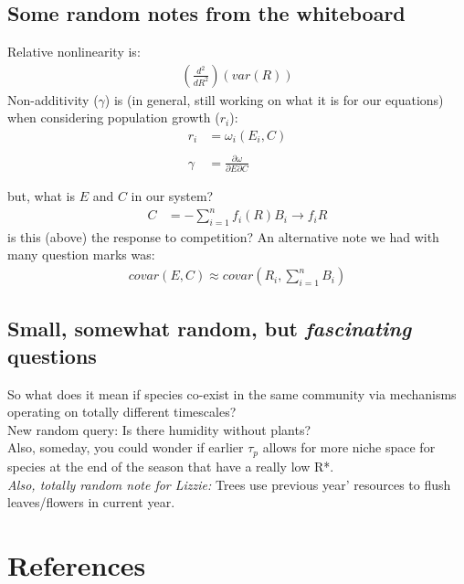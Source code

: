 \documentclass[11pt,a4paper,oneside]{article}
\begin{document}
\subsection{Some random notes from the whiteboard}
\noindent Relative nonlinearity is:
\begin{align*}
\left(\frac{d^{2}}{dR^{2}}\right)(var(R))
\end{align*}
\noindent Non-additivity (\(\gamma\)) is (in general, still working on
what it is for our equations) when considering population growth
(\(r_{i}\)):
\begin{align*}
r_{i} & = \omega_{i}(E_{i}, C)
\\
\\
\gamma & = \frac{\partial \omega}{\partial E \partial C} 
\end{align*}

\noindent but, what is \(E\) and \(C\) in our system?
\begin{align*}
C & = - \sum_{i=1}^{n}f_{i}(R)B_{i} \rightarrow f_{i}R
\end{align*}
\noindent is this (above) the response to
  competition? An alternative note we had with many question marks
  was:
\begin{align*}
covar(E,C) \approx covar\left(R_{i}, \sum_{i=1}^{n}B_{i}\right)
\end{align*}

\subsection{Small, somewhat random, but \emph{fascinating} questions} 
\noindent So what does it mean if species co-exist in the same community via mechanisms operating on totally different timescales?\\

\noindent  New random query: Is there humidity without plants?\\

\noindent  Also, someday, you could wonder if earlier \(\tau_{p}\) allows for more niche space for species at the end of the season that have a really low R*.\\

\noindent  \emph{Also, totally random note for Lizzie:} Trees use previous year' resources to flush leaves/flowers in current year.



\newpage
\section{References}


\end{document}
